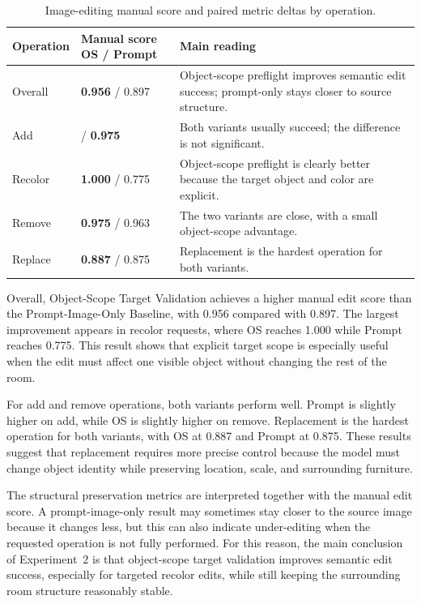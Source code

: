 \begin{table}[!htbp]
\centering
\small
\setlength{\tabcolsep}{4pt}
\renewcommand{\arraystretch}{1.15}
\caption{Image-editing manual score and paired metric deltas by operation.}\label{tab:8-3}
\begin{tabularx}{\textwidth}{|>{\raggedright\arraybackslash}p{1.9cm}|>{\raggedright\arraybackslash}p{3.4cm}|>{\raggedright\arraybackslash}X|}
\hline
\textbf{Operation} & \textbf{Manual score OS / Prompt} & \textbf{Main reading} \\
\hline
Overall & \textbf{0.956} / 0.897 & Object-scope preflight improves semantic edit success; prompt-only stays closer to source structure. \\
\hline
Add & 0.963 / \textbf{0.975} & Both variants usually succeed; the difference is not significant. \\
\hline
Recolor & \textbf{1.000} / 0.775 & Object-scope preflight is clearly better because the target object and color are explicit. \\
\hline
Remove & \textbf{0.975} / 0.963 & The two variants are close, with a small object-scope advantage. \\
\hline
Replace & \textbf{0.887} / 0.875 & Replacement is the hardest operation for both variants. \\
\hline
\end{tabularx}
\end{table}

Overall, Object-Scope Target Validation achieves a higher manual edit score than the Prompt-Image-Only Baseline, with 0.956 compared with 0.897. The largest improvement appears in recolor requests, where OS reaches 1.000 while Prompt reaches 0.775. This result shows that explicit target scope is especially useful when the edit must affect one visible object without changing the rest of the room.

For add and remove operations, both variants perform well. Prompt is slightly higher on add, while OS is slightly higher on remove. Replacement is the hardest operation for both variants, with OS at 0.887 and Prompt at 0.875. These results suggest that replacement requires more precise control because the model must change object identity while preserving location, scale, and surrounding furniture.

The structural preservation metrics are interpreted together with the manual edit score. A prompt-image-only result may sometimes stay closer to the source image because it changes less, but this can also indicate under-editing when the requested operation is not fully performed. For this reason, the main conclusion of Experiment~2 is that object-scope target validation improves semantic edit success, especially for targeted recolor edits, while still keeping the surrounding room structure reasonably stable.

